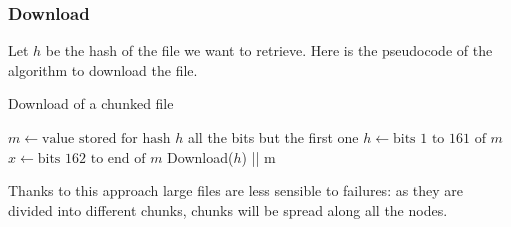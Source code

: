 \documentclass[a4paper]{article}
\begin{document}
        \subsubsection{Download}
        Let $h$ be the hash of the file we want to retrieve. Here is the pseudocode of the algorithm to download the file.

\begin{algorithm}
    \caption{Download of a chunked file}\label{euclid}
\begin{algorithmic}[1]
\State $m \gets \text{value stored for hash } h$
    \State \Return all the bits but the first one
    \Else {}
        \State $h \gets \text{bits 1 to 161 of }m$ 
        \State $x \gets \text{bits 162 to end of }m$
        \State\Return Download($h$) || m
    \EndIf
\EndProcedure
\end{algorithmic}
\end{algorithm}

Thanks to this approach large files are less sensible to failures: as they are divided into different chunks, chunks will be spread along all the nodes.




\end{document}
